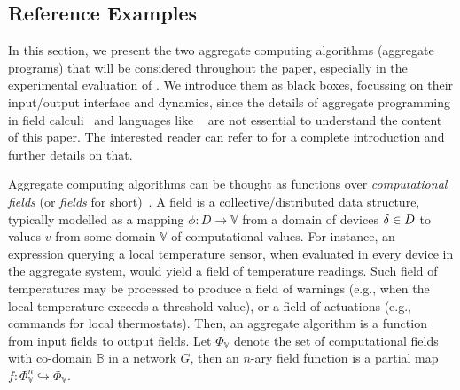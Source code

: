 \subsection{Reference Examples}
\label{s:background:ac-prog}

In this section,
 we present the two aggregate computing algorithms (aggregate programs)
 that will be considered throughout the paper,
 especially in the experimental evaluation of .
%
We introduce them as black boxes, 
 focussing on their input/output interface and dynamics,
 since the details of aggregate programming in field calculi~\cite{DBLP:journals/computer/BealPV15,DBLP:journals/jlap/ViroliBDACP19}
 and languages like \scafi{}~\cite{DBLP:conf/isola/CasadeiVAD20}
 are not essential to understand the content of this paper. 
%
The interested reader can refer to \cite{DBLP:journals/jlap/ViroliBDACP19,DBLP:conf/isola/CasadeiVAD20,DBLP:journals/eaai/CasadeiVAPD21} for a complete introduction and further details on that.

Aggregate computing algorithms
 can be thought as functions
 over \emph{computational fields} (or \emph{fields} for short)~\cite{DBLP:journals/jlap/ViroliBDACP19,DBLP:journals/pervasive/MameiZL04}.
%
A field is a collective/distributed data structure,
 typically modelled as 
 a mapping $\phi: D \to \mathbb{V}$
 from a domain of devices $\delta \in D$
 to values $v$ from some domain $\mathbb{V}$ of computational values.
%
For instance,
 an expression querying a local temperature sensor,
 when evaluated in every device in the aggregate system,
 would yield a field of temperature readings.
%
Such field of temperatures may be processed
 to produce a field of warnings (e.g., when the local temperature exceeds a threshold value),
 or a field of actuations (e.g., commands for local thermostats).
%
Then,
 an aggregate algorithm
 is a function from input fields to output fields.
%
Let $\Phi_\mathbb{V}$ denote the set of computational fields with co-domain $\mathbb{B}$ in a network $G$,
 then an $n$-ary field function is a partial map
 $f: \Phi_\mathbb{V}^n \hookrightarrow \Phi_\mathbb{V}$.
 
